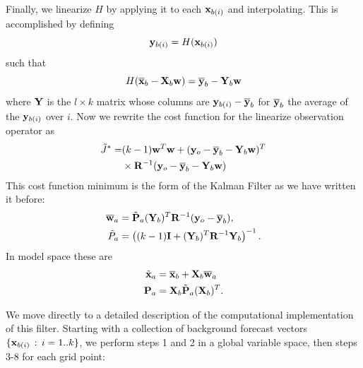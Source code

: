 \documentclass[12pt]{report}
\begin{document}
Finally, we linearize $H$ by applying it to each $\mathbf{x}_{b(i)}$ and interpolating.
This is accomplished by defining
\begin{equation} \mathbf{y} _{b(i)} = H( \mathbf{x}_{b(i)}) \end{equation}
such that 
\begin{equation} H(\overline{\mathbf{x}}_b - \mathbf{X}_b \mathbf{w}) = \overline{\mathbf{y}}_b - \mathbf{Y} _b \mathbf{w} \end{equation}
where $\mathbf{Y}$ is the $l\times k$ matrix whose columns are $\mathbf{y}_{b(i)} - \overline{\mathbf{y}}_b$ for $\overline{\mathbf{y}}_b$ the average of the $\mathbf{y}_{b(i)}$ over $i$.
Now we rewrite the cost function for the linearize observation operator as
\begin{align*} \tilde{J}^* = &(k-1)\mathbf{w}^T \mathbf{w} + (\mathbf{y} _o -\overline{\mathbf{y}} _b - \mathbf{Y} _b \mathbf{w} )^T\\
&\times\mathbf{R}^{-1} (\mathbf{y} _o -\overline{\mathbf{y}} _b - \mathbf{Y} _b \mathbf{w} ) \end{align*}
This cost function minimum is the form of the Kalman Filter as we have written it before:
\begin{align*} \overline{\mathbf{w}}_a &= \tilde{\mathbf{P}}_a (\mathbf{Y} _b )^T \mathbf{R} ^{-1} (\mathbf{y}_o - \overline{\mathbf{y}}_b),\\
\tilde{P}_a &= \left( (k-1)\mathbf{I}+(\mathbf{Y}_b)^T\mathbf{R}^{-1}\mathbf{Y}_b\right ) ^{-1} .\end{align*}
In model space these are
\begin{align*} \tilde{\mathbf{x}}_a &= \overline{\mathbf{x}} _b + \mathbf{X} _b \overline{\mathbf{w}}_a \\
\mathbf{P} _a &= \mathbf{X} _b \tilde{\mathbf{P}}_a (\mathbf{X} _b)^T . \end{align*}

We move directly to a detailed description of the computational implementation of this filter.
Starting with a collection of background forecast vectors $\{ \mathbf{x}_{b(i)} \,:\,i=1..k \}$, we perform steps 1 and 2 in a global variable space, then steps 3-8 for each grid point:
\end{document}
